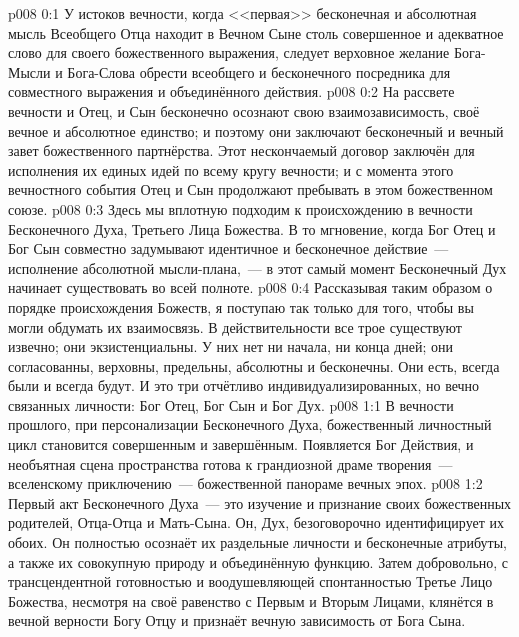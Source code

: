 \author{Божественный Советник}
\vs p008 0:1 У истоков вечности, когда <<первая>> бесконечная и абсолютная мысль Всеобщего Отца находит в Вечном Сыне столь совершенное и адекватное слово для своего божественного выражения, следует верховное желание Бога\hyp{}Мысли и Бога\hyp{}Слова обрести всеобщего и бесконечного посредника для совместного выражения и объединённого действия.
\vs p008 0:2 На рассвете вечности и Отец, и Сын бесконечно осознают свою взаимозависимость, своё вечное и абсолютное единство; и поэтому они заключают бесконечный и вечный завет божественного партнёрства. Этот нескончаемый договор заключён для исполнения их единых идей по всему кругу вечности; и с момента этого вечностного события Отец и Сын продолжают пребывать в этом божественном союзе.
\vs p008 0:3 Здесь мы вплотную подходим к происхождению в вечности Бесконечного Духа, Третьего Лица Божества. В то мгновение, когда Бог Отец и Бог Сын совместно задумывают идентичное и бесконечное действие~--- исполнение абсолютной мысли\hyp{}плана,~--- в этот самый момент Бесконечный Дух начинает существовать во всей полноте.
\vs p008 0:4 \pc Рассказывая таким образом о порядке происхождения Божеств, я поступаю так только для того, чтобы вы могли обдумать их взаимосвязь. В действительности все трое существуют извечно; они экзистенциальны. У них нет ни начала, ни конца дней; они согласованны, верховны, предельны, абсолютны и бесконечны. Они есть, всегда были и всегда будут. И это три отчётливо индивидуализированных, но вечно связанных личности: Бог Отец, Бог Сын и Бог Дух.
\vs p008 1:1 В вечности прошлого, при персонализации Бесконечного Духа, божественный личностный цикл становится совершенным и завершённым. Появляется Бог Действия, и необъятная сцена пространства готова к грандиозной драме творения~--- вселенскому приключению~--- божественной панораме вечных эпох.
\vs p008 1:2 Первый акт Бесконечного Духа~--- это изучение и признание своих божественных родителей, Отца\hyp{}Отца и Мать\hyp{}Сына. Он, Дух, безоговорочно идентифицирует их обоих. Он полностью осознаёт их раздельные личности и бесконечные атрибуты, а также их совокупную природу и объединённую функцию. Затем добровольно, с трансцендентной готовностью и воодушевляющей спонтанностью Третье Лицо Божества, несмотря на своё равенство с Первым и Вторым Лицами, клянётся в вечной верности Богу Отцу и признаёт вечную зависимость от Бога Сына.
